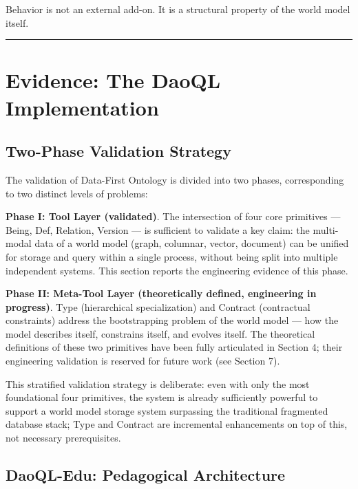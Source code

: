 \documentclass[11pt,a4paper]{article}
\begin{document}
Behavior is not an external add-on. It is a structural property of the
world model itself.

\begin{center}\rule{0.5\linewidth}{0.5pt}\end{center}

\section{Evidence: The DaoQL
Implementation}\label{evidence-the-daoql-implementation}

\subsection{Two-Phase Validation
Strategy}\label{two-phase-validation-strategy}

The validation of Data-First Ontology is divided into two phases,
corresponding to two distinct levels of problems:

\textbf{Phase I: Tool Layer (validated)}. The intersection of four core
primitives --- Being, Def, Relation, Version --- is sufficient to
validate a key claim: the multi-modal data of a world model (graph,
columnar, vector, document) can be unified for storage and query within
a single process, without being split into multiple independent systems.
This section reports the engineering evidence of this phase.

\textbf{Phase II: Meta-Tool Layer (theoretically defined, engineering in
progress)}. Type (hierarchical specialization) and Contract (contractual
constraints) address the bootstrapping problem of the world model ---
how the model describes itself, constrains itself, and evolves itself.
The theoretical definitions of these two primitives have been fully
articulated in Section 4; their engineering validation is reserved for
future work (see Section 7).

This stratified validation strategy is deliberate: even with only the
most foundational four primitives, the system is already sufficiently
powerful to support a world model storage system surpassing the
traditional fragmented database stack; Type and Contract are incremental
enhancements on top of this, not necessary prerequisites.

\subsection{DaoQL-Edu: Pedagogical
Architecture}\label{daoql-edu-pedagogical-architecture}
\end{document}
